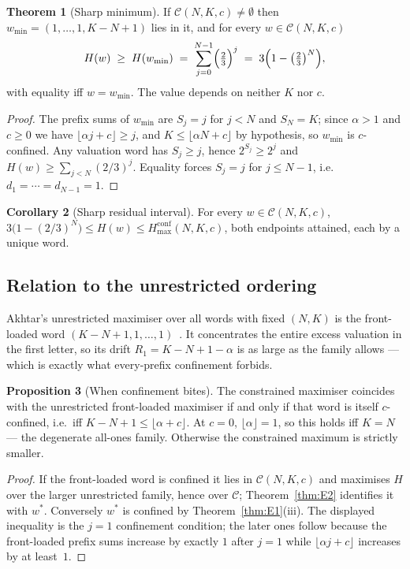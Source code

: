 \documentclass[11pt,a4paper]{article}
\theoremstyle{plain}
\theoremstyle{definition}
\newcommand{\Cc}{\mathcal{C}}
\newtheorem{thmE}{Theorem}[section]
\newtheorem{propE}[thmE]{Proposition}
\newtheorem{corE}[thmE]{Corollary}
\newcommand{\al}{\alpha}
\begin{document}
\begin{thmE}[Sharp minimum]\label{thm:E3}
If $\Cc(N,K,c)\neq\emptyset$ then $w_{\min}=(1,\dots,1,K-N+1)$ lies in it, and
for every $w\in\Cc(N,K,c)$
\[
H(w)\;\ge\;H(w_{\min})\;=\;\sum_{j=0}^{N-1}\Bigl(\tfrac23\Bigr)^{j}
\;=\;3\Bigl(1-\bigl(\tfrac23\bigr)^{N}\Bigr),
\]
with equality iff $w=w_{\min}$. The value depends on neither $K$ nor $c$.
\end{thmE}

\begin{proof}
The prefix sums of $w_{\min}$ are $S_j=j$ for $j<N$ and $S_N=K$; since
$\al>1$ and $c\ge0$ we have $\lfloor \al j+c\rfloor\ge j$, and $K\le
\lfloor \al N+c\rfloor$ by hypothesis, so $w_{\min}$ is $c$-confined. Any
valuation word has $S_j\ge j$, hence $2^{S_j}\ge2^{j}$ and
$H(w)\ge\sum_{j<N}(2/3)^{j}$. Equality forces $S_j=j$ for $j\le N-1$, i.e.
$d_1=\cdots=d_{N-1}=1$.
\end{proof}

\begin{corE}[Sharp residual interval]\label{cor:E4}
For every $w\in\Cc(N,K,c)$,
$3\bigl(1-(2/3)^{N}\bigr)\le H(w)\le H^{\mathrm{conf}}_{\max}(N,K,c)$, both
endpoints attained, each by a unique word.
\end{corE}

\subsection{Relation to the unrestricted ordering}

Akhtar's unrestricted maximiser over all words with fixed $(N,K)$ is the
front-loaded word $(K-N+1,1,\dots,1)$~\cite[Thm.~6]{akhtar2026}. It concentrates
the entire excess valuation in the first letter, so its drift
$R_1=K-N+1-\al$ is as large as the family allows --- which is exactly what
every-prefix confinement forbids.

\begin{propE}[When confinement bites]\label{prop:E5}
The constrained maximiser coincides with the unrestricted front-loaded
maximiser if and only if that word is itself $c$-confined, i.e.\ iff
$K-N+1\le\lfloor \al+c\rfloor$. At $c=0$, $\lfloor \al\rfloor=1$, so this holds
iff $K=N$ --- the degenerate all-ones family. Otherwise the constrained
maximum is strictly smaller.
\end{propE}

\begin{proof}
If the front-loaded word is confined it lies in $\Cc(N,K,c)$ and maximises $H$
over the larger unrestricted family, hence over $\Cc$; Theorem~\ref{thm:E2}
identifies it with $w^{*}$. Conversely $w^{*}$ is confined by
Theorem~\ref{thm:E1}(iii). The displayed inequality is the $j=1$ confinement
condition; the later ones follow because the front-loaded prefix sums increase
by exactly $1$ after $j=1$ while $\lfloor \al j+c\rfloor$ increases by at
least~$1$.
\end{proof}
\end{document}
